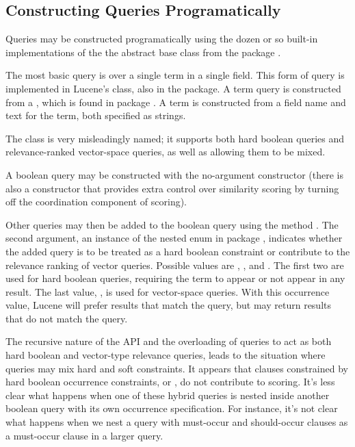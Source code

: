 \subsection{Constructing Queries Programatically}

Queries may be constructed programatically using the dozen or so
built-in implementations of the the  abstract base class
from the package .  

The most basic query is over a single term in a single field.  This
form of query is implemented in Lucene's  class, also
in the  package.  A term query is constructed from a
, which is found in package .
A term is constructed from a field name and text for the term, both
specified as strings.

The  class is very misleadingly named; it
supports both hard boolean queries and relevance-ranked vector-space
queries, as well as allowing them to be mixed.

A boolean query may be constructed with the no-argument constructor
 (there is also a constructor that provides extra
control over similarity scoring by turning off the coordination component
of scoring).

Other queries may then be added to the boolean query using the method
.  The second argument, an
instance of the nested enum  in package
, indicates whether the added query is to be treated as a
hard boolean constraint or contribute to the relevance ranking of
vector queries.  Possible values are ,
, and .  The
first two are used for hard boolean queries, requiring the term to
appear or not appear in any result.  The last value, , is
used for vector-space queries.  With this occurrence value, Lucene
will prefer results that match the query, but may return results that
do not match the query.%

The recursive nature of the API and the overloading of queries to act
as both hard boolean and vector-type relevance queries, leads to the
situation where queries may mix hard and soft constraints.  It appears
that clauses constrained by hard boolean occurrence constraints,
 or , do not contribute to scoring.  It's
less clear what happens when one of these hybrid queries is nested
inside another boolean query with its own occurrence specification.
For instance, it's not clear what happens when we nest a query with
must-occur and should-occur clauses as a must-occur clause in a larger
query.
%


